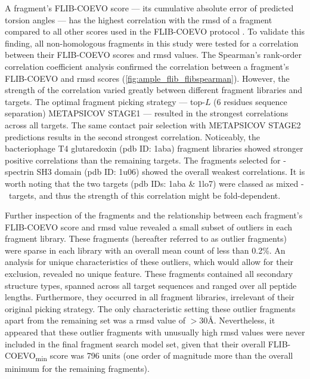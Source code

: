 A fragment's FLIB-COEVO score --- its cumulative absolute error of predicted torsion angles --- has the highest correlation with the \gls{rmsd} of a fragment compared to all other scores used in the FLIB-COEVO protocol \cite{De_Oliveira2018-za}. To validate this finding, all non-homologous fragments in this study were tested for a correlation between their FLIB-COEVO scores and \gls{rmsd} values. The Spearman's rank-order correlation coefficient analysis confirmed the correlation between a fragment's FLIB-COEVO and \gls{rmsd} scores (\cref{fig:ample_flib_flibspearman}). However, the strength of the correlation varied greatly between different fragment libraries and targets. The optimal fragment picking strategy --- top-$L$ (6 residues sequence separation) METAPSICOV STAGE1 --- resulted in the strongest correlations across all targets. The same contact pair selection with METAPSICOV STAGE2 predictions results in the second strongest correlation. Noticeably, the bacteriophage T4 glutaredoxin (\gls{pdb} ID: 1aba) fragment libraries showed stronger positive correlations than the remaining targets. The fragments selected for \textalpha-spectrin SH3 domain (\gls{pdb} ID: 1u06) showed the overall weakest correlations. It is worth noting that the two targets (\gls{pdb} IDs: 1aba \& 1lo7) were classed as mixed \textalpha-\textbeta\ targets, and thus the strength of this correlation might be fold-dependent.

Further inspection of the fragments and the relationship between each fragment's FLIB-COEVO score and \gls{rmsd} value revealed a small subset of outliers in each fragment library. These fragments (hereafter referred to as outlier fragments) were sparse in each library with an overall mean count of less than 0.2\%. An analysis for unique characteristics of these outliers, which would allow for their exclusion, revealed no unique feature. These fragments contained all secondary structure types, spanned across all target sequences and ranged over all peptide lengths. Furthermore, they occurred in all fragment libraries, irrelevant of their original picking strategy. The only characteristic setting these outlier fragments apart from the remaining set was a \gls{rmsd} value of $>30$\AA. Nevertheless, it appeared that these outlier fragments with unusually high \gls{rmsd} values were never included in the final fragment search model set, given that their overall FLIB-COEVO\textsubscript{min} score was 796 units (one order of magnitude more than the overall minimum for the remaining fragments).

